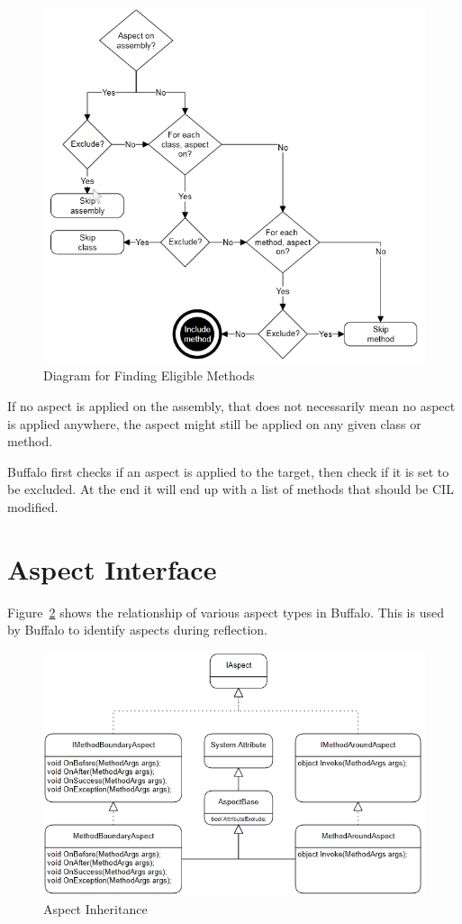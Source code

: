\begin{figure}[H]
  \includegraphics[scale=1.0]{AspectLogicalInclusion2.PNG}
  \centering
  \caption{Diagram for Finding Eligible Methods\label{logical_inclusion}}
\end{figure}

If no aspect is applied on the assembly, that does not necessarily mean no aspect is applied anywhere, the aspect might still be applied on any given class or method.

Buffalo first checks if an aspect is applied to the target, then check if it is set to be excluded. At the end it will end up with a list of methods that should be CIL modified.

\section{Aspect Interface}

Figure~\ref{uml01} shows the relationship of various aspect types in Buffalo. This is used by Buffalo to identify aspects during reflection.

\begin{figure}[H]
  \includegraphics[scale=1.0]{Uml02.PNG}
  \centering
  \caption{Aspect Inheritance\label{uml01}}
\end{figure}

